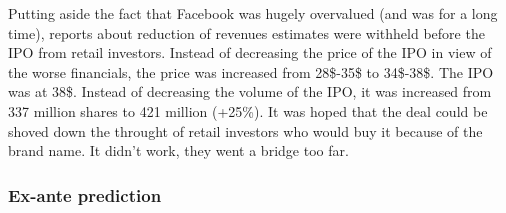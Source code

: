 Putting aside the fact that Facebook was hugely overvalued (and was for
a long time), reports about reduction of revenues estimates were withheld
before the IPO from retail investors. Instead of decreasing the price of
the IPO in view of the worse financials, the price was increased from
28\$-35\$ to 34\$-38\$. The IPO was at 38\$. Instead of decreasing the
volume of the IPO, it was increased from 337 million shares to 421 million
(+25\%). It was hoped that the deal could be shoved down the throught of
retail investors who would buy it because of the brand name. It didn't work,
they went a bridge too far.

\subsubsection{Ex-ante prediction}

